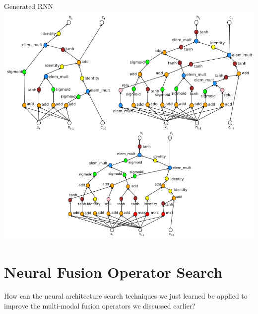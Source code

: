 \documentclass{beamer}
\begin{document}
{%
\begin{frame}{Generated RNN}
        \center{}
        \vspace{-0.25cm}
        \includegraphics[scale=0.32]{data/neural_arch_rnn_output}
\end{frame}
}


\section{Neural Fusion Operator Search}

\begin{frame}[standout]
        How can the neural architecture search techniques we just learned be
        applied to improve the multi-modal fusion operators we discussed
        earlier?
\end{frame}
\end{document}
